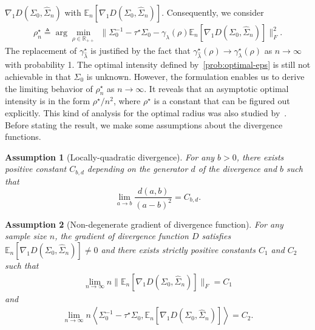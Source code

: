 \documentclass[11pt]{article}
\def\R{\mathbb{R}}
\def\la{\langle}
\def\ra{\rangle}
\newtheorem{assumption}{Assumption}
\newcommand{\bgeqn}{\begin{eqnarray}}
\newcommand{\edeqn}{\end{eqnarray}}
\newcommand{\opt}{^\star}
\newcommand{\Let}{\triangleq}
\def\R{\mathbb{R}}
\def\E {\mathbb{E}}
\def\la{\langle}
\def\ra{\rangle}
\newcommand{\wh}{\widehat}
\begin{document}
${\nabla_1 D }(\Sigma_0,\wh\Sigma_n)$ with  $\E_n[{\nabla_1 D }(\Sigma_0,\wh\Sigma_n)]$. Consequently, we consider
\begin{align}
     \rho_n\opt \Let\arg\min_{ \rho\in \R_{++}}\;\|\Sigma_0^{-1}-\tau\opt \Sigma_0-\gamma_{\lambda}( \rho) \E_n[ {\nabla_1 D } (\Sigma_0, \wh \Sigma_n)]\|_F^2. \label{prob:optimal-eps}
\end{align}
The replacement of $\gamma\opt_{\wh\lambda}$ is justified by the fact that $\gamma_{\wh\lambda}\opt(\rho)\to\gamma\opt_{\lambda}(\rho)$  as $n\to\infty$ with probability 1.
The optimal intensity defined by~\eqref{prob:optimal-eps} is still not achievable in that $\Sigma_0$ is unknown. However, the formulation enables us to derive the limiting behavior of $ \rho_n\opt$ as $n\to \infty$. It reveals that an asymptotic optimal intensity is in the form $\rho\opt/ n^{2}$, where $\rho\opt$ is a constant that can be figured out explicitly.
This kind of analysis for the optimal radius was also studied by~\cite{ref:BLANCHET2019618}. Before stating the result, we make some assumptions about the divergence functions. 


\begin{assumption}[Locally-quadratic divergence]\label{ass:like-frob}
    For any $b>0$, there exists positive constant $C_{b,d}$ depending on the generator $d$ of the divergence and $b$ such that 
    \[
        \lim_{a\to b} \frac{d(a,b)}{(a-b)^2} = C_{b,d}.
    \]
\end{assumption}

\begin{assumption}[Non-degenerate gradient of divergence function]\label{ass:D'neq0}
     For any sample size $n$, the gradient of divergence function $D$ satisfies $\E_n[{\nabla_1 D }(\Sigma_0, \wh\Sigma_n)]\neq 0$ and there exists strictly positive constants $C_1$ and $C_2$ such that 
     \bgeqn
     \label{eq:asymp1-NbD-1}
        \lim_{n\to\infty} n\|\E_n[{\nabla_1 D }(\Sigma_0, \wh\Sigma_n)]\|_F = C_1
     \edeqn 
     and
     \bgeqn 
     \label{eq:asymp1-NbD-2}
        \lim_{n\to\infty} n\left\la \Sigma_0^{-1}-\tau\opt\Sigma_0, \E_n [{\nabla_1 D }(\Sigma_0, \wh\Sigma_n)]\right\ra=C_2.
     \edeqn 
\end{assumption}
\end{document}
